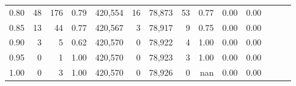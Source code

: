 \begin{tabular}{rrrrrrrrrrrrrr}
0.80 &       48 &     176 &  0.79 &  420,554 &       16 &  78,873 &      53 &  0.77 &  0.00 &      0.00 \\
0.85 &       13 &      44 &  0.77 &  420,567 &        3 &  78,917 &       9 &  0.75 &  0.00 &      0.00 \\
0.90 &        3 &       5 &  0.62 &  420,570 &        0 &  78,922 &       4 &  1.00 &  0.00 &      0.00 \\
0.95 &        0 &       1 &  1.00 &  420,570 &        0 &  78,923 &       3 &  1.00 &  0.00 &      0.00 \\
1.00 &        0 &       3 &  1.00 &  420,570 &        0 &  78,926 &       0 &   nan &  0.00 &      0.00 \\
\bottomrule
\end{tabular}

